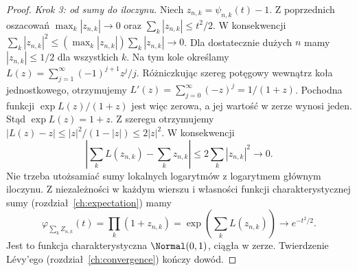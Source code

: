 \begin{proof}
\emph{Krok 3: od sumy do iloczynu.} Niech
$z_{n,k}=\psi_{n,k}(t)-1$. Z poprzednich oszacowań
$\max_k|z_{n,k}|\to0$ oraz
$\sum_k|z_{n,k}|\leq t^2/2$.
W konsekwencji
$\sum_k|z_{n,k}|^2\leq
(\max_k|z_{n,k}|)\sum_k|z_{n,k}|\to0$.
Dla dostatecznie dużych $n$ mamy $|z_{n,k}|\leq1/2$
dla wszystkich $k$. Na tym kole określamy
$L(z)=\sum_{j=1}^\infty(-1)^{j+1}z^j/j$.
Różniczkując szereg potęgowy wewnątrz koła jednostkowego,
otrzymujemy $L'(z)=\sum_{j=0}^\infty(-z)^j=1/(1+z)$.
Pochodna funkcji $\exp L(z)/(1+z)$ jest więc zerowa,
a jej wartość w zerze wynosi jeden. Stąd $\exp L(z)=1+z$.
Z szeregu otrzymujemy
$|L(z)-z|\leq |z|^2/(1-|z|)\leq2|z|^2$.
W konsekwencji
\[
\left|\sum_k L(z_{n,k})-\sum_k z_{n,k}\right|
\leq 2\sum_k|z_{n,k}|^2\longrightarrow0.
\]
Nie trzeba utożsamiać sumy lokalnych logarytmów
z logarytmem głównym iloczynu. Z niezależności w każdym wierszu i własności
funkcji charakterystycznej sumy (rozdział~\ref{ch:expectation}) mamy
\[
\varphi_{\sum_k Z_{n,k}}(t)
=\prod_k(1+z_{n,k})
=\exp\left(\sum_k L(z_{n,k})\right)
\longrightarrow e^{-t^2/2}.
\]
Jest to funkcja charakterystyczna $\Normal(0,1)$,
ciągła w zerze. Twierdzenie Lévy'ego
(rozdział~\ref{ch:convergence}) kończy dowód.
\end{proof}


